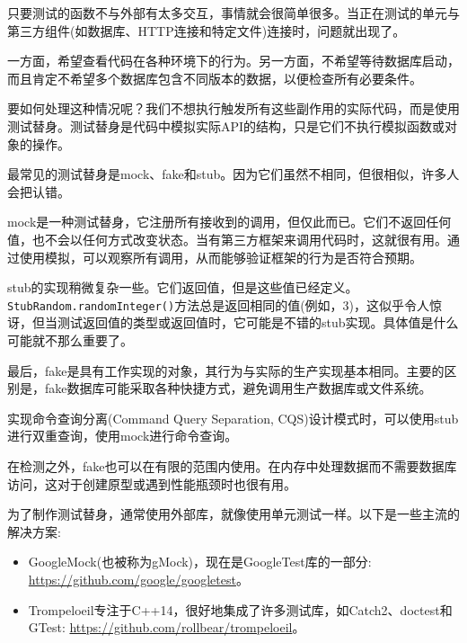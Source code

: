 
只要测试的函数不与外部有太多交互，事情就会很简单很多。当正在测试的单元与第三方组件(如数据库、HTTP连接和特定文件)连接时，问题就出现了。

一方面，希望查看代码在各种环境下的行为。另一方面，不希望等待数据库启动，而且肯定不希望多个数据库包含不同版本的数据，以便检查所有必要条件。

要如何处理这种情况呢？我们不想执行触发所有这些副作用的实际代码，而是使用测试替身。测试替身是代码中模拟实际API的结构，只是它们不执行模拟函数或对象的操作。

最常见的测试替身是mock、fake和stub。因为它们虽然不相同，但很相似，许多人会把认错。


mock是一种测试替身，它注册所有接收到的调用，但仅此而已。它们不返回任何值，也不会以任何方式改变状态。当有第三方框架来调用代码时，这就很有用。通过使用模拟，可以观察所有调用，从而能够验证框架的行为是否符合预期。

stub的实现稍微复杂一些。它们返回值，但是这些值已经定义。\texttt{StubRandom.randomInteger()}方法总是返回相同的值(例如，3)，这似乎令人惊讶，但当测试返回值的类型或返回值时，它可能是不错的stub实现。具体值是什么可能就不那么重要了。

最后，fake是具有工作实现的对象，其行为与实际的生产实现基本相同。主要的区别是，fake数据库可能采取各种快捷方式，避免调用生产数据库或文件系统。

实现命令查询分离(Command Query Separation, CQS)设计模式时，可以使用stub进行双重查询，使用mock进行命令查询。


在检测之外，fake也可以在有限的范围内使用。在内存中处理数据而不需要数据库访问，这对于创建原型或遇到性能瓶颈时也很有用。


为了制作测试替身，通常使用外部库，就像使用单元测试一样。以下是一些主流的解决方案:

\begin{itemize}
\item 
GoogleMock(也被称为gMock)，现在是GoogleTest库的一部分: \url{https://github.com/google/googletest}。

\item 
Trompeloeil专注于C++14，很好地集成了许多测试库，如Catch2、doctest和GTest: \url{https://github.com/rollbear/trompeloeil}。
\end{itemize}

